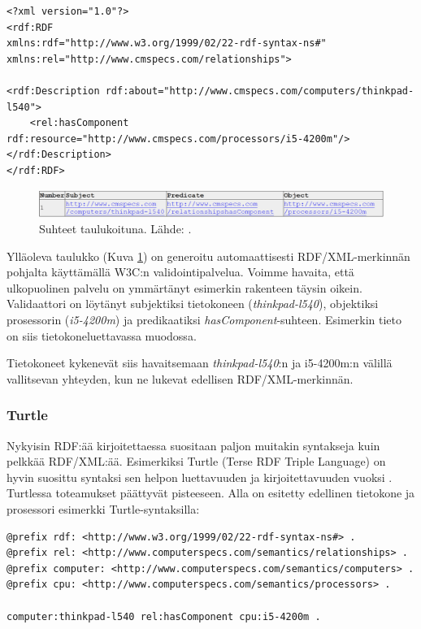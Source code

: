 \documentclass[finnish, 12pt, a4paper, elec, utf8, pdfa, online]{aaltothesis}
\begin{document}
\vskip 0.75cm
\begin{lstlisting}[style=codeblock,caption={RDF/XML syntaksiesimerkki.},captionpos=b,label={rdf_esim}]
<?xml version="1.0"?>
<rdf:RDF
xmlns:rdf="http://www.w3.org/1999/02/22-rdf-syntax-ns#"
xmlns:rel="http://www.cmspecs.com/relationships">

<rdf:Description rdf:about="http://www.cmspecs.com/computers/thinkpad-l540">
    <rel:hasComponent rdf:resource="http://www.cmspecs.com/processors/i5-4200m"/>
</rdf:Description>
</rdf:RDF>
\end{lstlisting}
\vskip 0.75cm

\begin{figure}[htb]
\centering
\includegraphics[width=15cm]{images/RDF-valid.PNG}
\caption{Suhteet taulukoituna. Lähde: \cite{W3C_RDF_validator}. \label{images/RDF-valid}}
\end{figure}

Ylläoleva taulukko (Kuva \ref{images/RDF-valid}) on generoitu automaattisesti RDF/XML-merkinnän pohjalta käyttämällä W3C:n validointipalvelua. Voimme havaita, että ulkopuolinen palvelu on ymmärtänyt esimerkin rakenteen täysin oikein. Validaattori on löytänyt subjektiksi tietokoneen (\textit{thinkpad-l540}), objektiksi prosessorin (\textit{i5-4200m}) ja predikaatiksi \textit{hasComponent}-suhteen. Esimerkin tieto on siis tietokoneluettavassa muodossa.

Tietokoneet kykenevät siis havaitsemaan \textit{thinkpad-l540}:n ja i5-4200m:n välillä vallitsevan yhteyden, kun ne lukevat edellisen RDF/XML-merkinnän.


\subsubsection{Turtle}
Nykyisin RDF:ää kirjoitettaessa suositaan paljon muitakin syntakseja kuin pelkkää RDF/XML:ää. Esimerkiksi Turtle (Terse RDF Triple Language) on hyvin suosittu syntaksi sen helpon luettavuuden ja kirjoitettavuuden vuoksi \cite{cambridge2}. Turtlessa toteamukset päättyvät pisteeseen. Alla on esitetty edellinen tietokone ja prosessori esimerkki Turtle-syntaksilla:

\vskip 0.75cm
\begin{lstlisting}[style=codeblock,caption={Turtle syntaksiesimerkki.},captionpos=b,label={turtle_esim}]
@prefix rdf: <http://www.w3.org/1999/02/22-rdf-syntax-ns#> .
@prefix rel: <http://www.computerspecs.com/semantics/relationships> .
@prefix computer: <http://www.computerspecs.com/semantics/computers> .
@prefix cpu: <http://www.computerspecs.com/semantics/processors> .

computer:thinkpad-l540 rel:hasComponent cpu:i5-4200m .

\end{lstlisting}
\vskip 0.75cm
\end{document}
